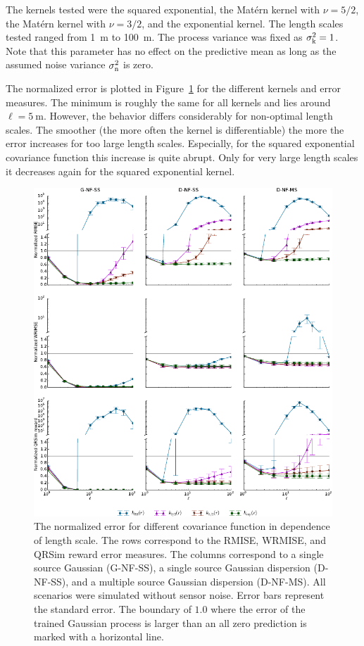 The kernels tested were the squared exponential, the Mat\'ern kernel with $\nu 
= 5/2$, the Mat\'ern kernel with $\nu = 3/2$, and the exponential kernel. The 
length scales tested ranged from \SI{1}{\meter} to \SI{100}{\meter}. The process 
variance was fixed as $\sigma_{\mathrm{k}}^2 = 1$. Note that this parameter has no 
effect on the predictive mean as long as the assumed noise variance 
$\sigma_{\mathrm{n}}^2$ is zero.

The normalized error is plotted in Figure~\ref{fig:lengthscales} for the 
different kernels and error measures. The minimum is roughly the same for all 
kernels and lies around $\ell = \SI{5}{\meter}$.  However, the behavior differs 
considerably for non-optimal length scales.  The smoother (the more often the 
kernel is differentiable) the more the error increases for too large length 
scales.  Especially, for the squared exponential covariance function this 
increase is quite abrupt. Only for very large length scales it decreases again 
for the squared exponential kernel.

\begin{figure}
    \centering
    \includegraphics{plots/lengthscales}
    \caption[Influence of the length scale of the covariance functions]{The 
        normalized error for different covariance function in dependence of 
        length scale.  The rows correspond to the RMISE, WRMISE, and QRSim 
        reward error measures.  The columns correspond to a single source 
        Gaussian (G-NF-SS), a single source Gaussian dispersion (D-NF-SS), and 
        a multiple source Gaussian dispersion (D-NF-MS). All scenarios were 
        simulated without sensor noise.  Error bars represent the standard 
        error. The boundary of $1.0$ where the error of the trained Gaussian 
        process is larger than an all zero prediction is marked with 
        a horizontal line.}\label{fig:lengthscales}
\end{figure}

